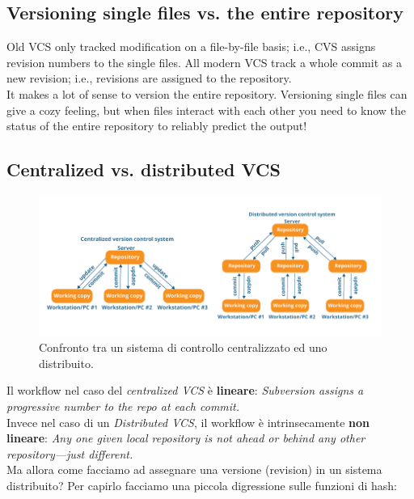 \subsection{Versioning single files vs. the entire repository}

Old VCS only tracked modification on a file-by-file basis; i.e., CVS assigns revision numbers to the single files.
All modern VCS track a whole commit as a new revision; i.e., revisions are assigned to the repository.\\
It makes a lot of sense to version the entire repository.
Versioning single files can give a cozy feeling, but when files interact with each other you need to know the status
of the entire repository to reliably predict the output!



\subsection{Centralized vs. distributed VCS}





\begin{figure}[ht]
    \centering
    \includegraphics[width=1\textwidth]{lez1/centralvsdistr.png}
    \caption{Confronto tra un sistema di controllo centralizzato ed uno distribuito.}
    \label{confrontoVCS}
\end{figure}
\FloatBarrier

Il workflow nel caso del \textit{centralized VCS} è \textbf{lineare}: \textit{Subversion assigns a progressive number to the repo at each commit.}\\

Invece nel caso di un \textit{Distributed VCS}, il workflow è intrinsecamente \textbf{non lineare}: \textit{Any one given local repository is not ahead or behind any other
repository—just different.}\\
Ma allora come facciamo ad assegnare una versione (revision) in un sistema distribuito? Per capirlo facciamo una piccola digressione sulle funzioni di hash:

